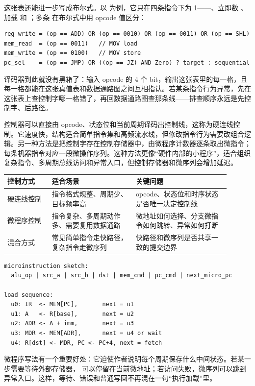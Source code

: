 这张表还能进一步写成布尔式。以  为例，它只在四条指令下为 1——、立即数 、加载  和 ；多条  在布尔式中用 opcode 值区分：

\begin{lstlisting}
reg_write = (op == ADD) OR (op == 0010) OR (op == 0011) OR (op == SHL)
mem_read  = (op == 0011)   // MOV load
mem_write = (op == 0100)   // MOV store
pc_sel    = (op == JMP) OR ((op == JZ) AND Zero) ? target : sequential
\end{lstlisting}

译码器到此就没有黑箱了：输入 opcode 的 4 个 bit，输出这张表里的每一格，且每一格都能在这张真值表和数据通路图之间互相指认。若某条指令行为异常，先在这张表上查控制字哪一格错了，再回数据通路图查那条线——排查顺序永远是先控制字、后路径。

控制器可以直接由 opcode、状态位和当前周期译码出控制线，这称为硬连线控制。它速度快，结构适合简单指令集和高频流水线，但修改指令行为需要改组合逻辑。另一种方法是把控制字存在控制存储器中，由微程序计数器逐条取出微指令；每条机器指令对应一段微操作序列。这种方法更像“硬件内部的小程序”，适合组织复杂指令、多周期总线访问和异常入口，但控制存储器和微序列会增加延迟。

\begin{longtable}{L{0.18\linewidth}L{0.34\linewidth}L{0.38\linewidth}}
\toprule
控制方式 & 适合场景 & 关键问题 \\
\midrule
硬连线控制 & 指令格式规整、周期少、目标频率高 & opcode、状态位和时序状态是否唯一决定控制线 \\
微程序控制 & 指令复杂、多周期动作多、需要复用数据通路 & 微地址如何选择、分支微指令如何跳转、异常如何打断 \\
混合方式 & 常见简单指令走快路径，复杂指令走微序列 & 快路径和微序列是否共享一致的提交边界 \\
\bottomrule
\end{longtable}

\begin{lstlisting}
microinstruction sketch:
  alu_op | src_a | src_b | dst | mem_cmd | pc_cmd | next_micro_pc

load sequence:
  u0: IR  <- MEM[PC],       next = u1
  u1: A   <- R[base],       next = u2
  u2: ADR <- A + imm,       next = u3
  u3: MDR <- MEM[ADR],      next = u4 or wait
  u4: R[dst] <- MDR, PC <- PC+4, next = fetch
\end{lstlisting}

微程序写法有一个重要好处：它迫使作者说明每个周期保存什么中间状态。若某一步需要等待外部存储器， 可以停留在当前微地址；若访问失败，微序列可以跳到异常入口。这样，等待、错误和普通写回不再混在一句“执行加载”里。

